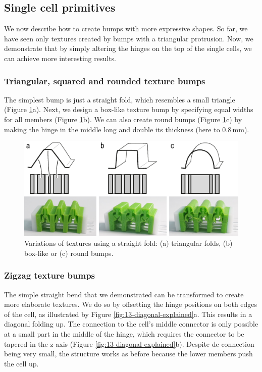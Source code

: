 \subsection{Single cell primitives}

We now describe how to create bumps with more expressive shapes. So far, we have seen only textures created by bumps with a triangular protrusion. Now, we demonstrate that by simply altering the hinges on the top of the single cells, we can achieve more interesting results. 

\subsubsection{Triangular, squared and rounded texture bumps}

The simplest bump is just a straight fold, which resembles a small triangle (Figure \ref{fig:12-straight-hinges}a). Next, we design a box-like texture bump by specifying equal widths for all members (Figure \ref{fig:12-straight-hinges}b). We can also create round bumps (Figure \ref{fig:12-straight-hinges}c) by making the hinge in the middle long and double its thickness (here to $0.8\, \mathrm{mm}$).

\begin{figure} [h]  
    \includegraphics[width=\textwidth]{chapters/metamaterial-textures-FIG/12-straight-hinges.pdf}
    \caption[Short figure name.]{Variations of textures using a straight fold: (a) triangular folds, (b) box-like or (c) round bumps.
    \label{fig:12-straight-hinges}}
\end{figure}

\subsubsection{Zigzag texture bumps}
The simple straight bend that we demonstrated can be transformed to create more elaborate textures. We do so by offsetting the hinge positions on both edges of the cell, as illustrated by Figure \ref{fig:13-diagonal-explained}a. This results in a diagonal folding up. The connection to the cell's middle connector is only possible at a small part in the middle of the hinge, which requires the connector to be tapered in the z-axis (Figure \ref{fig:13-diagonal-explained}b). Despite de connection being very small, the structure works as before because the lower members push the cell up. 

